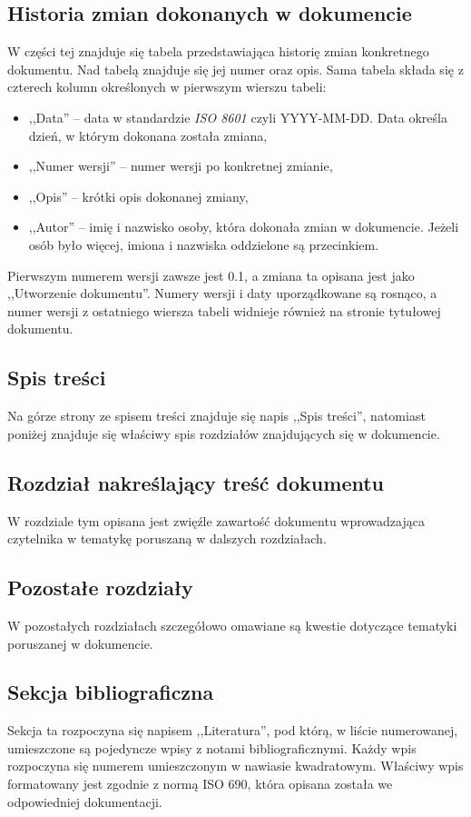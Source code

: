 \documentclass [11pt, a4paper, leqno]	{article}	%
\begin{document}
\subsection{Historia zmian dokonanych w dokumencie}
\noindent
W części tej znajduje się tabela przedstawiająca historię zmian konkretnego dokumentu. Nad tabelą znajduje się jej numer oraz opis. Sama tabela składa się z czterech kolumn określonych w pierwszym wierszu tabeli:
\begin{itemize}
	\item ,,Data'' -- data w standardzie \textit{ISO 8601} czyli YYYY-MM-DD. Data określa dzień, w którym dokonana została zmiana,
	\item ,,Numer wersji'' -- numer wersji po konkretnej zmianie,
	\item ,,Opis'' -- krótki opis dokonanej zmiany,
	\item ,,Autor'' -- imię i nazwisko osoby, która dokonała zmian w dokumencie. Jeżeli osób było więcej, imiona i nazwiska oddzielone są przecinkiem.
\end{itemize}

Pierwszym numerem wersji zawsze jest 0.1, a zmiana ta opisana jest jako ,,Utworzenie dokumentu''. Numery wersji i daty uporządkowane są rosnąco, a numer wersji z ostatniego wiersza tabeli widnieje również na stronie tytułowej dokumentu.

\subsection{Spis treści}
\noindent
Na górze strony ze spisem treści znajduje się napis ,,Spis treści'', natomiast poniżej znajduje się właściwy spis rozdziałów znajdujących się w dokumencie. 

\subsection{Rozdział nakreślający treść dokumentu}
\noindent
W rozdziale tym opisana jest zwięźle zawartość dokumentu wprowadzająca czytelnika w tematykę poruszaną w dalszych rozdziałach.

\subsection{Pozostałe rozdziały}
\noindent
W pozostałych rozdziałach szczegółowo omawiane są kwestie dotyczące tematyki poruszanej w dokumencie.

\subsection{Sekcja bibliograficzna}
\noindent
Sekcja ta rozpoczyna się napisem ,,Literatura'', pod którą, w liście numerowanej, umieszczone są pojedyncze wpisy z notami bibliograficznymi.
Każdy wpis rozpoczyna się numerem umieszczonym w nawiasie kwadratowym. Właściwy wpis formatowany jest zgodnie z normą ISO 690, która opisana została we odpowiedniej dokumentacji. 
\end{document}
